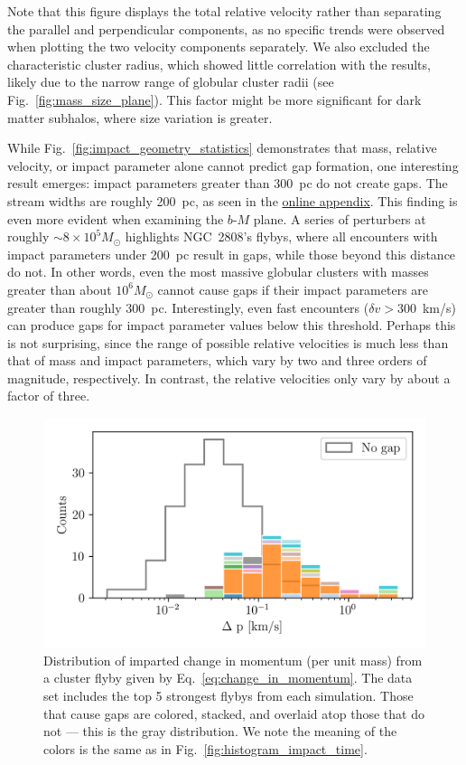         Note that this figure displays the total relative velocity rather than separating the parallel and perpendicular components, as no specific trends were observed when plotting the two velocity components separately. We also excluded the characteristic cluster radius, which showed little correlation with the results, likely due to the narrow range of globular cluster radii (see Fig.~\ref{fig:mass_size_plane}). This factor might be more significant for dark matter subhalos, where size variation is greater.      
  
        While Fig.~\ref{fig:impact_geometry_statistics} demonstrates that mass, relative velocity, or impact parameter alone cannot predict gap formation, one interesting result emerges: impact parameters greater than 300~pc do not create gaps. The stream widths are roughly 200~pc, as seen in the \href{https://doi.org/10.5281/zenodo.15528089}{online appendix}. This finding is even more evident when examining the $b$-$M$ plane. A series of perturbers at roughly $\sim8 \times 10^5 M_\odot$ highlights NGC~2808's flybys, where all encounters with impact parameters under 200~pc result in gaps, while those beyond this distance do not. In other words, even the most massive globular clusters with masses greater than about $10^6 M_\odot$ cannot cause gaps if their impact parameters are greater than roughly $300$~pc. Interestingly, even fast encounters ($\delta v > 300$~km/s) can produce gaps for impact parameter values below this threshold. Perhaps this is not surprising, since the range of possible relative velocities is much less than that of mass and impact parameters, which vary by two and three orders of magnitude, respectively. In contrast, the relative velocities only vary by about a factor of three.

        \begin{figure}
            \centering
            \includegraphics[width=1\linewidth]{images/impact_geometry_statistics_deltaP.png}
            \caption{Distribution of imparted change in momentum (per unit mass) from a cluster flyby given by Eq.~\ref{eq:change_in_momentum}. The data set includes the top 5 strongest flybys from each simulation. Those that cause gaps are colored, stacked, and overlaid atop those that do not — this is the gray distribution. We note the meaning of the colors is the same as in Fig.~\ref{fig:histogram_impact_time}.}
            \label{fig:deltap}
        \end{figure}

